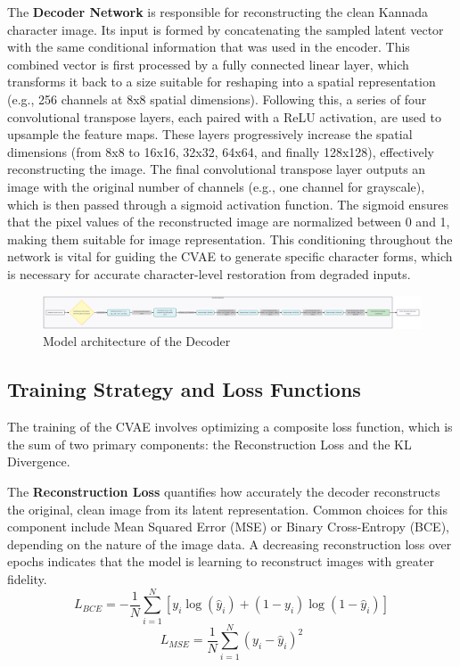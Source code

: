 \documentclass[conference]{IEEEtran}
\begin{document}
The \textbf{Decoder Network} is responsible for reconstructing the clean Kannada character image. Its input is formed by concatenating the sampled latent vector with the same conditional information that was used in the encoder. This combined vector is first processed by a fully connected linear layer, which transforms it back to a size suitable for reshaping into a spatial representation (e.g., 256 channels at 8x8 spatial dimensions). Following this, a series of four convolutional transpose layers, each paired with a ReLU activation, are used to upsample the feature maps. These layers progressively increase the spatial dimensions (from 8x8 to 16x16, 32x32, 64x64, and finally 128x128), effectively reconstructing the image. The final convolutional transpose layer outputs an image with the original number of channels (e.g., one channel for grayscale), which is then passed through a sigmoid activation function. The sigmoid ensures that the pixel values of the reconstructed image are normalized between 0 and 1, making them suitable for image representation. This conditioning throughout the network is vital for guiding the CVAE to generate specific character forms, which is necessary for accurate character-level restoration from degraded inputs.\cite{Emuru2023}
\begin{figure}[htbp]
    \centering
    \includegraphics[width=\columnwidth]{decoder.png} %
    \caption{Model architecture of the Decoder}
    \label{fig:single_column_image}
\end{figure}
\subsection{Training Strategy and Loss Functions}
\justify
The training of the CVAE involves optimizing a composite loss function, which is the sum of two primary components: the Reconstruction Loss and the KL Divergence.\cite{Kumar2020}

The \textbf{Reconstruction Loss} quantifies how accurately the decoder reconstructs the original, clean image from its latent representation. Common choices for this component include Mean Squared Error (MSE) or Binary Cross-Entropy (BCE), depending on the nature of the image data.\cite{Kumar2020} A decreasing reconstruction loss over epochs indicates that the model is learning to reconstruct images with greater fidelity.\cite{Kumar2020}
$$L_{BCE} = -\frac{1}{N} \sum_{i=1}^{N} [y_i \log(\hat{y}_i) + (1 - y_i) \log(1 - \hat{y}_i)]$$
$$L_{MSE} = \frac{1}{N} \sum_{i=1}^{N} (y_i - \hat{y}_i)^2$$
\end{document}
